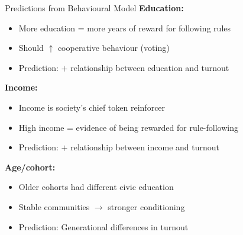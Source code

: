 \documentclass[10pt]{beamer}
\begin{document}
\begin{frame}{Predictions from Behavioural Model}
\textbf{Education:}
\begin{itemize}
\item More education = more years of reward for following rules
\item Should $\uparrow$ cooperative behaviour (voting)
\item Prediction: $+$ relationship between education and turnout
\end{itemize}

\textbf{Income:}
\begin{itemize}
\item Income is society's chief token reinforcer
\item High income = evidence of being rewarded for rule-following
\item Prediction: $+$ relationship between income and turnout
\end{itemize}

\textbf{Age/cohort:}
\begin{itemize}
\item Older cohorts had different civic education
\item Stable communities $\rightarrow$ stronger conditioning
\item Prediction: Generational differences in turnout
\end{itemize}
\end{frame}
\end{document}
